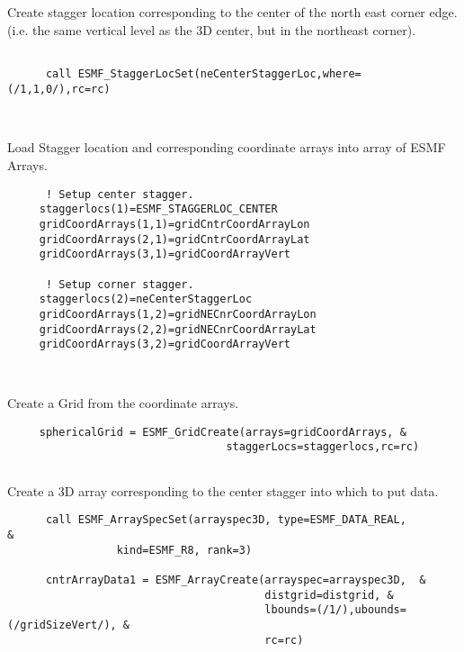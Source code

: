 
    Create stagger location corresponding to the center of the north east corner
    edge. (i.e. the same vertical level as the 3D center, but in the northeast corner). 

 \begin{verbatim}

      call ESMF_StaggerLocSet(neCenterStaggerLoc,where=(/1,1,0/),rc=rc)

 
\end{verbatim}
 

   Load Stagger location and corresponding coordinate arrays into array of ESMF Arrays.
   

 \begin{verbatim}
      ! Setup center stagger.
     staggerlocs(1)=ESMF_STAGGERLOC_CENTER
     gridCoordArrays(1,1)=gridCntrCoordArrayLon     
     gridCoordArrays(2,1)=gridCntrCoordArrayLat     
     gridCoordArrays(3,1)=gridCoordArrayVert     

      ! Setup corner stagger.
     staggerlocs(2)=neCenterStaggerLoc
     gridCoordArrays(1,2)=gridNECnrCoordArrayLon     
     gridCoordArrays(2,2)=gridNECnrCoordArrayLat     
     gridCoordArrays(3,2)=gridCoordArrayVert     

 
\end{verbatim}
 

      Create a Grid from the coordinate arrays.  

 \begin{verbatim}
     sphericalGrid = ESMF_GridCreate(arrays=gridCoordArrays, &
                                  staggerLocs=staggerlocs,rc=rc)
 
\end{verbatim}
 

    Create a 3D array corresponding to the center stagger into which to put data. 

 \begin{verbatim}
      call ESMF_ArraySpecSet(arrayspec3D, type=ESMF_DATA_REAL,         &
                 kind=ESMF_R8, rank=3)

      cntrArrayData1 = ESMF_ArrayCreate(arrayspec=arrayspec3D,  &
                                        distgrid=distgrid, &
                                        lbounds=(/1/),ubounds=(/gridSizeVert/), &
                                        rc=rc)
 
\end{verbatim}

\setlength{\parskip}{\oldparskip}
\setlength{\parindent}{\oldparindent}
\setlength{\baselineskip}{\oldbaselineskip}
